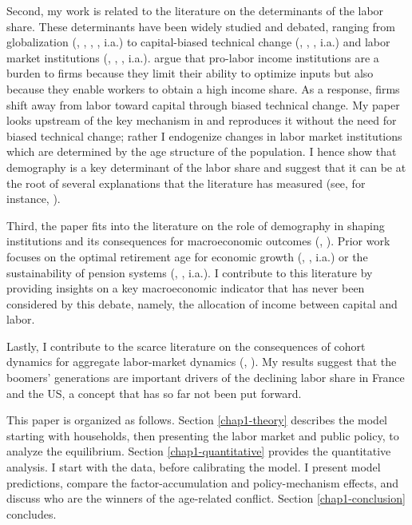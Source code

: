 Second, my work is related to the literature on the determinants of the labor share. These determinants have been widely studied and debated, ranging from globalization (\citealt{Jayadev2007Capital}, \citealt{Pica2010Capital}, \citealt{Young2018Globalization}, \citealt{Autor2020Fall}, i.a.) to capital-biased technical change (\citealt{Acemoglu2002Directed},  \citealt{Acemoglu2003Labor}, \citealt{Karabarbounis2014Global}, i.a.) and labor market institutions (\citealt{Blanchard1997Medium}, \citealt{Bentolila2003Explaining}, \citealt{Bental2010Declining}, i.a.). \citet{Caballero1998Jobless} argue that pro-labor income institutions are a burden to firms because they limit their ability to optimize inputs but also because they enable workers to obtain a high income share. As a response, firms shift away from labor toward capital through biased technical change. My paper looks upstream of the key mechanism in \citet{Caballero1998Jobless} and reproduces it without the need for biased technical change; rather I endogenize changes in labor market institutions which are determined by the age structure of the population. I hence show that demography is a key determinant of the labor share and suggest that it can be at the root of several explanations that the literature has measured (see, for instance, \citealt{Bergholt2021Decline}).

Third, the paper fits into the literature on the role of demography in shaping institutions and its consequences for macroeconomic outcomes (\citealt{Lee2010Macroeconomic}, \citealt{Aksoy2019Demographic}). Prior work focuses on the optimal retirement age for economic growth (\citealt{Futagami2001Population}, \citealt{Gonzalez-Eiras2012Ageing}, i.a.) or the sustainability of pension systems (\citealt{DelaCroix2013Aging}, \citealt{Dedry2017Aging}, i.a.). I contribute to this literature by providing insights on a key macroeconomic indicator that has never been considered by this debate, namely, the allocation of income between capital and labor.

Lastly, I contribute to the scarce literature on the consequences of cohort dynamics for aggregate labor-market dynamics (\citealt{Shimer1998Why}, \citealt{Ferraro2020Aging}). My results suggest that the boomers' generations are important drivers of the declining labor share in France and the US, a concept that has so far not been put forward.

This paper is organized as follows. Section \ref{chap1-theory} describes the model starting with households, then presenting the labor market and public policy, to analyze the equilibrium. Section \ref{chap1-quantitative} provides the quantitative analysis. I start with the data, before calibrating the model. I present model predictions, compare the factor-accumulation and policy-mechanism effects, and discuss who are the winners of the age-related conflict. Section \ref{chap1-conclusion} concludes.